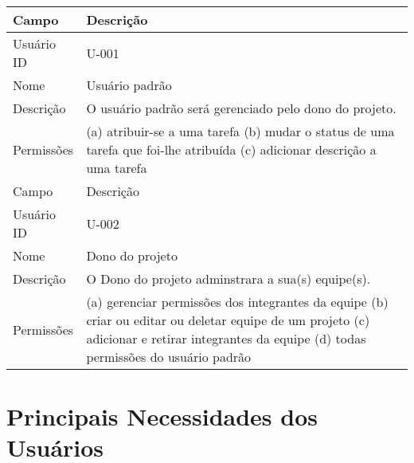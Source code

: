 \begin{table}[htbp]
\begin{tabularx}{\textwidth}{lX}
\hline
Campo             & Descrição                                                                                                                                                                           \\ \hline
Usuário ID    & U-001                                                                                                                                                                              \\ \hline
Nome              & Usuário padrão                                                                                                                                                                       \\ \hline
Descrição         & O usuário padrão será gerenciado pelo dono do projeto.                                                                                                  \\ \hline
Permissões & (a) atribuir-se a uma tarefa (b) mudar o status de uma tarefa que foi-lhe atribuída (c) adicionar descrição a uma tarefa 
\\ \hline

Campo             & Descrição                                                                                                                                                                           \\ \hline
Usuário ID    & U-002                                                                                                                                                                              \\ \hline
Nome              & Dono do projeto                                                                                                                                                                       \\ \hline
Descrição         & O Dono do projeto adminstrara a sua(s) equipe(s).                                                                                                  \\ \hline
Permissões & (a) gerenciar permissões dos integrantes da equipe (b) criar ou editar ou deletar equipe de um projeto (c) adicionar e retirar integrantes da equipe (d) todas permissões do usuário padrão  \\ \hline

\end{tabularx}
\end{table}   


\section{Principais Necessidades dos Usuários}
